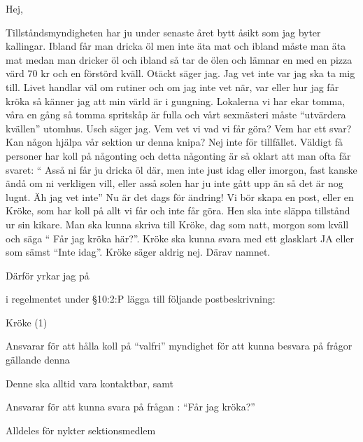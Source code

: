 \documentclass[../_main/handlingar.tex]{subfiles}
\begin{document}

Hej, 

Tillståndsmyndigheten har ju under senaste året bytt åsikt som jag byter kallingar. Ibland
får man dricka öl men inte äta mat och ibland måste man äta mat medan man dricker öl och
ibland så tar de ölen och lämnar en med en pizza värd 70 kr och en förstörd kväll. Otäckt
säger jag. Jag vet inte var jag ska ta mig till. Livet handlar väl om rutiner och om jag inte vet
när, var eller hur jag får kröka så känner jag att min värld är i gungning. Lokalerna vi har ekar
tomma, våra en gång så tomma spritskåp är fulla och vårt sexmästeri måste “utvärdera
kvällen” utomhus. Usch säger jag. Vem vet vi vad vi får göra? Vem har ett svar? Kan någon
hjälpa vår sektion ur denna knipa? Nej inte för tillfället. Väldigt få personer har koll på
någonting och detta någonting är så oklart att man ofta får svaret: “ Asså ni får ju dricka öl
där, men inte just idag eller imorgon, fast kanske ändå om ni verkligen vill, eller asså solen
har ju inte gått upp än så det är nog lugnt. Äh jag vet inte” Nu är det dags för ändring! Vi bör
skapa en post, eller en Kröke, som har koll på allt vi får och inte får göra. Hen ska inte
släppa tillstånd ur sin kikare. Man ska kunna skriva till Kröke, dag som natt, morgon som
kväll och säga “ Får jag kröka här?”. Kröke ska kunna svara med ett glasklart JA eller som
sämst “Inte idag”. Kröke säger aldrig nej. Därav namnet.


Därför yrkar jag på
\begin{attsatser}

    \att i regelmentet under \S10:2:P lägga till följande postbeskrivning: \par
    \begin{emptylist}
        \item Kröke (1)
        \begin{dashlist}
            \item Ansvarar för att hålla koll på “valfri” myndighet för att kunna besvara på frågor gällande denna
            \item Denne ska alltid vara kontaktbar, samt
            \item Ansvarar för att kunna svara på frågan : “Får jag kröka?”
        \end{dashlist}
    \end{emptylist}
\end{attsatser}


\begin{signatures}{1}
    \isekt
    \signature{Anonym}{Alldeles för nykter sektionsmedlem}
\end{signatures}
\end{document}
